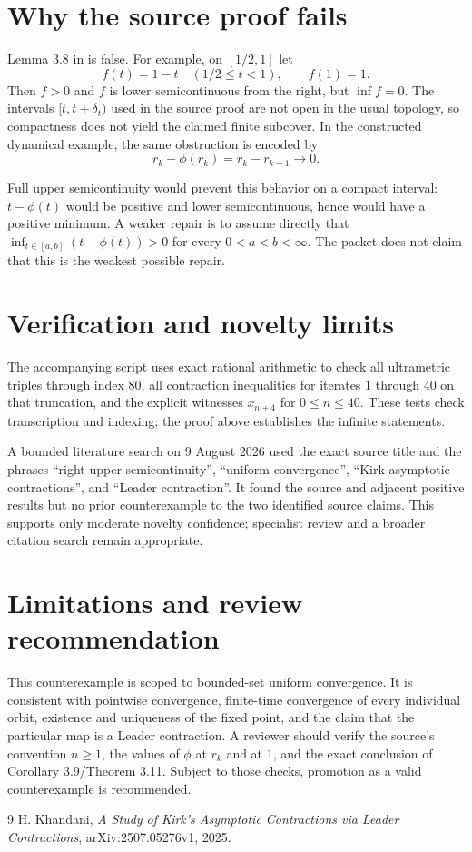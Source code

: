 \documentclass[11pt]{article}
\begin{document}
\section{Why the source proof fails}

Lemma 3.8 in \cite{khandani} is false.  For example, on $[1/2,1]$ let
\[
 f(t)=1-t\quad(1/2\leq t<1),\qquad f(1)=1.
\]
Then $f>0$ and $f$ is lower semicontinuous from the right, but
$\inf f=0$.  The intervals $[t,t+\delta_t)$ used in the source proof are not
open in the usual topology, so compactness does not yield the claimed finite
subcover.  In the constructed dynamical example, the same obstruction is
encoded by
\[
 r_k-\phi(r_k)=r_k-r_{k-1}\longrightarrow0.
\]

Full upper semicontinuity would prevent this behavior on a compact interval:
$t-\phi(t)$ would be positive and lower semicontinuous, hence would have a
positive minimum.  A weaker repair is to assume directly that
$\inf_{t\in[a,b]}(t-\phi(t))>0$ for every $0<a<b<\infty$.  The packet does
not claim that this is the weakest possible repair.

\section{Verification and novelty limits}

The accompanying script uses exact rational arithmetic to check all
ultrametric triples through index $80$, all contraction inequalities for
iterates $1$ through $40$ on that truncation, and the explicit witnesses
$x_{n+4}$ for $0\leq n\leq40$.  These tests check transcription and indexing;
the proof above establishes the infinite statements.

A bounded literature search on 9 August 2026 used the exact source title and
the phrases ``right upper semicontinuity'', ``uniform convergence'',
``Kirk asymptotic contractions'', and ``Leader contraction''.  It found the
source and adjacent positive results but no prior counterexample to the two
identified source claims.  This supports only moderate novelty confidence;
specialist review and a broader citation search remain appropriate.

\section{Limitations and review recommendation}

This counterexample is scoped to bounded-set uniform convergence.  It is
consistent with pointwise convergence, finite-time convergence of every
individual orbit, existence and uniqueness of the fixed point, and the claim
that the particular map is a Leader contraction.  A reviewer should verify
the source's convention $n\geq1$, the values of $\phi$ at $r_k$ and at $1$,
and the exact conclusion of Corollary 3.9/Theorem 3.11.  Subject to those
checks, promotion as a valid counterexample is recommended.

\begin{thebibliography}{9}
H. Khandani,
\emph{A Study of Kirk's Asymptotic Contractions via Leader Contractions},
arXiv:2507.05276v1, 2025.
\end{thebibliography}
\end{document}
